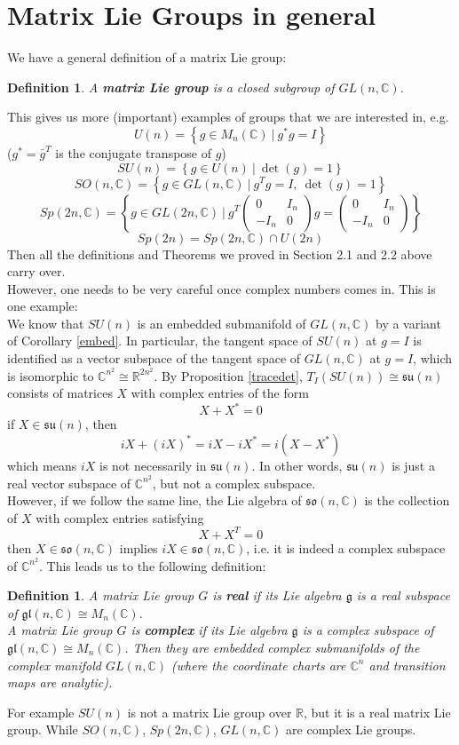 \documentclass[11pt]{book}
\newtheorem{definition}[theorem]{Definition}
\newcommand{\bb}[1]{\mathbb{#1}}
\newcommand{\mf}[1]{\mathfrak{#1}}
\begin{document}
\section{Matrix Lie Groups in general}
We have a general definition of a matrix Lie group:
\begin{definition}
A \textbf{matrix Lie group} is a closed subgroup of $GL(n,\bb{C})$.
\end{definition}
This gives us more (important) examples of groups that we are interested in, e.g.
$$U(n) = \left\{ g \in M_n(\bb{C})\ \Big|\ g^*g = I\right\}$$
($g^* = \bar{g}^T$ is the conjugate transpose of $g$)
$$SU(n) = \left\{ g \in U(n)\ \Big|\ \det(g) = 1\right\}$$
$$SO(n,\bb{C}) = \left\{g \in GL(n,\bb{C})\ \Big|\ g^Tg = I,\ \det(g) = 1 \right\}$$
$$Sp(2n,\bb{C})= \left\{g \in GL(2n,\bb{C})\ \Big|\ g^T\left( \begin{array}{cc}
0 & I_n \\
-I_n & 0 \end{array} \right)g = \left( \begin{array}{cc}
0 & I_n \\
-I_n & 0 \end{array} \right) \right\}$$
$$Sp(2n) = Sp(2n,\bb{C}) \cap U(2n)$$
Then all the definitions and Theorems we proved in Section 2.1 and 2.2 above carry over.\\
However, one needs to be very careful once complex numbers comes in. This is one example:\\
We know that $SU(n)$ is an embedded submanifold of $GL(n,\bb{C})$ by a variant of Corollary \ref{embed}. In particular, the tangent space of $SU(n)$ at $g = I$ is identified as a vector subspace of the tangent space of $GL(n,\bb{C})$ at $g = I$, which is isomorphic to $\bb{C}^{n^2} \cong \bb{R}^{2n^2}$. By Proposition \ref{tracedet}, $T_I(SU(n)) \cong \mf{su}(n)$ consists of matrices $X$ with complex entries of the form
$$X + X^* = 0$$
if $X \in \mf{su}(n)$, then
$$iX + (iX)^* = iX - iX^* = i(X - X^*)$$
which means $iX$ is not necessarily in $\mf{su}(n)$. In other words, $\mf{su}(n)$ is just a real vector subspace of $\bb{C}^{n^2}$, but not a complex subspace.\\
However, if we follow the same line, the Lie algebra of $\mf{so}(n,\bb{C})$ is the collection of $X$ with complex entries satisfying
$$X + X^T = 0$$
then $X \in \mf{so}(n,\bb{C})$ implies $iX \in \mf{so}(n,\bb{C})$, i.e. it is indeed a complex subspace of $\bb{C}^{n^2}$. This leads us to the following definition:
\begin{definition}
A matrix Lie group $G$ is \textbf{real} if its Lie algebra $\mf{g}$ is a real subspace of $\mf{gl}(n,\bb{C}) \cong M_n(\bb{C})$.\\
A matrix Lie group $G$ is \textbf{complex} if its Lie algebra $\mf{g}$ is a complex subspace of $\mf{gl}(n,\bb{C}) \cong M_n(\bb{C})$. Then they are embedded \textit{complex submanifolds} of the complex manifold $GL(n,\bb{C})$ (where the coordinate charts are $\bb{C}^n$ and transition maps are \textit{analytic}).
\end{definition}
For example $SU(n)$ is not a matrix Lie group over $\bb{R}$, but it is a real matrix Lie group. While $SO(n,\bb{C})$, $Sp(2n,\bb{C})$, $GL(n,\bb{C})$ are complex Lie groups.
\end{document}
